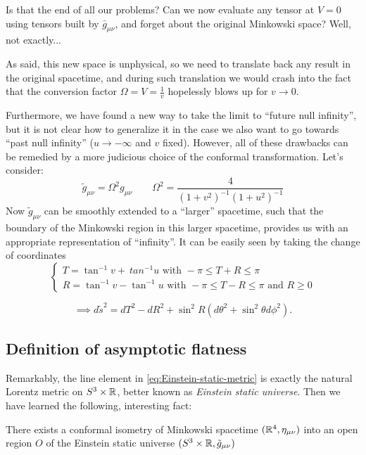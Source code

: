 Is that the end of all our problems? Can we now evaluate any tensor at \(V = 0\) using tensors built by \(\bar{g}_{\mu\nu}\), and forget about the original Minkowski space?
Well, not exactly...

\noindent As said, this new space is unphysical, so we need to translate back any result in the original spacetime, and during such translation we would crash into the fact that the conversion factor \(\Omega = V= \frac{1}{v}\) hopelessly blows up for \(v \rightarrow 0\).

Furthermore, we have found a new way to take the limit to ``future null infinity'', but it is not clear how to generalize it in the case we also want to go towards ``past null infinity'' (\(u \rightarrow -\infty\) and \(v\) fixed). However, all of these drawbacks can be remedied by a more judicious choice of the conformal transformation. Let's consider:
\[
\tilde{g}_{\mu\nu} = \Omega^2 g_{\mu\nu} \quad\quad \Omega^2 = \frac{4}{(1 + v^2)^{-1}(1 + u^2)^{-1}} 
\]
Now \(\tilde{g}_{\mu\nu}\) can be smoothly extended to a ``larger'' spacetime, such that the boundary of the Minkowski region in this larger spacetime, provides us with an appropriate representation of ``infinity''.
It can be easily seen by taking the change of coordinates
\[
\begin{cases}
T = \tan^{-1}v +\ tan^{-1}u \text{ with } -\pi \le T + R \le \pi\\
R = \tan^{-1}v - \tan^{-1}u \text{ with } -\pi \le T - R \le \pi \text{ and } R \ge 0
\end{cases}
\]

\begin{equation}
\label{eq:Einstein-static-metric}
	\implies
	d\tilde{s}^2 = dT^2 - dR^2 + \sin^2R(d\theta^2 + \sin^2\theta d\phi^2).
\end{equation}

\subsection{Definition of asymptotic flatness}
Remarkably, the line element in \eqref{eq:Einstein-static-metric} is exactly the natural Lorentz metric on \(S^3 \times {\mathbb{R}}\), better known as \emph{Einstein static universe}. Then we have learned the following, interesting fact:
\begin{prop}
	There exists a conformal isometry of Minkowski spacetime \(({\mathbb{R}}^4, \eta_{\mu\nu})\) into an open region \(O\) of the Einstein static universe \((S^3 \times {\mathbb{R}}, \tilde{g}_{\mu\nu})\)
\end{prop}

